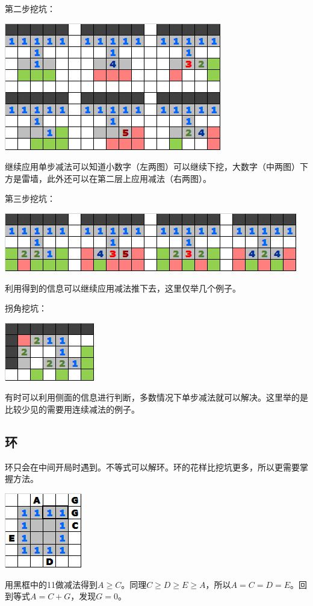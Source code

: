 \vspace{5mm}第二步挖坑：
\begin{center}
    \includegraphics[scale=0.6]{game/挖坑2.png}
\end{center}
继续应用单步减法可以知道小数字（左两图）可以继续下挖，大数字（中两图）下方是雷墙，此外还可以在第二层上应用减法（右两图）。

\vspace{5mm}第三步挖坑：
\begin{center}
    \includegraphics[scale=0.6]{game/挖坑3.png}
\end{center}
利用得到的信息可以继续应用减法推下去，这里仅举几个例子。

\vspace{5mm}拐角挖坑：
\begin{center}
    \includegraphics[scale=0.6]{game/挖坑4.png}
\end{center}
有时可以利用侧面的信息进行判断，多数情况下单步减法就可以解决。这里举的是比较少见的需要用连续减法的例子。

\subsection{环}\label{cycle}
环只会在中间开局时遇到。不等式可以解环。环的花样比挖坑更多，所以更需要掌握方法。

\vspace{5mm}
\begin{center}
    \includegraphics{trick/环1.png}
\end{center}
用黑框中的11做减法得到$A\ge C$。同理$C\ge D\ge E\ge A$，所以$A=C=D=E$。回到等式$A=C+G$，发现$G=0$。

